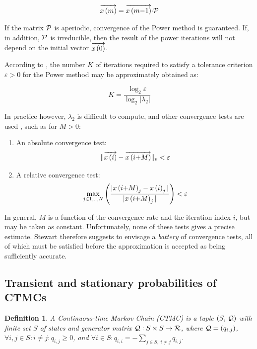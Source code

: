 \documentclass[a4paper,11pt]{article}
\newcommand{\SubSection}[1]{\subsection{#1}}
\newtheorem{definition}{Definition}
\begin{document}
		\begin{equation}
			\overrightarrow{x\left(m\right)}	= \overrightarrow{x\left(m{-}1\right)}{\cdot}\mathcal{P}
		\end{equation}

		If the matrix $\mathcal{P}$ is aperiodic, convergence of the Power method is guaranteed.  If, in addition, $\mathcal{P}$ is irreducible, then the result of the power iterations will not depend on the initial vector $\overrightarrow{x\left(0\right)}$.

		According to \cite{Stewart_94}, the number $K$ of iterations required to satisfy a tolerance criterion $\varepsilon > 0$ for the Power method may be approximately obtained as:
	
		\begin{equation}
			K = \dfrac{\log_{2} \varepsilon}{\log_{2} | \lambda_{2} |}
		\end{equation}
	
		In practice however, $ \lambda_{2}$ is difficult to compute, and other convergence tests are used \cite{Stewart_94}, such as for $M > 0$:
		\begin{enumerate}
			\item An absolute convergence test: \[\lVert \overrightarrow{x\left(i\right)} - \overrightarrow{x\left(i{+}M\right)} \rVert_{v} < \varepsilon\]
			\item A relative convergence test: \[\max_{j \in 1,..,N} \left( \frac{ | x\left(i{+}M\right)_{j} - x\left(i\right)_{j} |}{ | x\left(i{+}M\right)_{j} |} \right) < \varepsilon\]
		\end{enumerate}

		In general, $M$ is a function of the convergence rate and the iteration index $i$, but may be taken as constant.
		Unfortunately, none of these tests gives a precise estimate.  Stewart \cite{Stewart_94} therefore suggests to envisage a \emph{battery} of convergence tests, all of which must be satisfied before the approximation is accepted as being sufficiently accurate.

	\SubSection{Transient and stationary probabilities of CTMCs}
		
		\begin{definition}
			A Continuous-time Markov Chain (\emph{CTMC}) is a tuple $\left( S,\: \mathcal{Q} \right)$ with finite set $S$ of states and generator matrix $\mathcal{Q} : S \times S \rightarrow \mathcal{R}$, where $\mathcal{Q}=\left(q_{i,j}\right)$, $\forall i,j \in S : i \neq j : q_{i,j} \geq 0$, and $\forall i \in S : q_{i,i} = - \sum_{j \in S, \: i \neq j} q_{i,j}$. 
		\end{definition}
		
\end{document}
